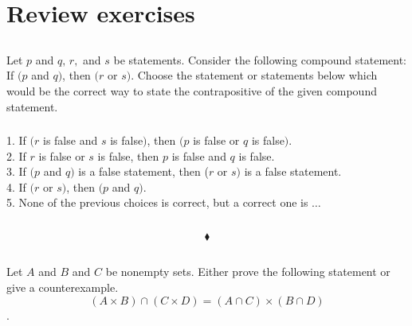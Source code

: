  \section{Review exercises}
 \renewcommand{\thesubsection}{\thesection.\RomanNumeralCaps{1}}
\subsection{}
Let $p$ and $q,\, r,$ and $s$ be statements. Consider the following compound statement: If $(p$ and $q)$, then $(r$ or $s)$. Choose the statement or statements below which would be the correct way to state the contrapositive of the given compound statement.
\setcounter{secnumdepth}{4}


 \subsubsection{}
\begin{tcolorbox}
1. If $(r$ is false and $s$ is false$)$, then $(p$ is false or $q$ is false$)$.  \\

2. If $r$ is false or $s$ is false, then $p$ is false and $q$ is false.   \\

3. If $(p$ and $q)$ is a false statement, then ($r$ or $s)$ is a false statement. \\

4. If $(r$ or $s)$, then $(p$ and $q)$. \\ 

5. None of the previous choices is correct, but a correct one is  $\dots$
\end{tcolorbox}
$$ $$

$$\blacklozenge$$




\renewcommand{\thesubsection}{\thesection.\RomanNumeralCaps{2}}
\subsection{}
\subsubsection{}
\begin{tcolorbox}
Let $A$ and $B$ and $C$ be nonempty sets. Either prove the following statement or give a counterexample. $$(A\times  B) \cap (C\times D) = (A\cap C) \times (B \cap D)$$.
\end{tcolorbox}
$$ $$

